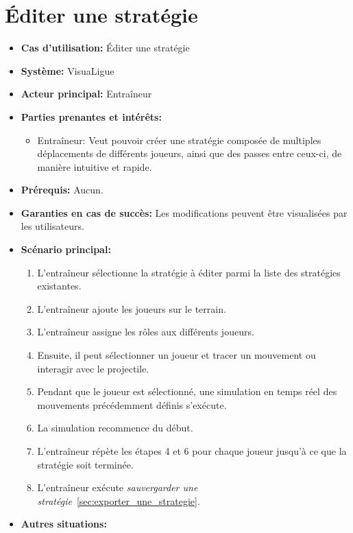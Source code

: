 \section{\'Editer une stratégie}
\label{sec:ajouter_une_strategie}
\begin{itemize}
    \item \textbf{Cas d'utilisation:} \'Editer une strat\'egie
    \item \textbf{Syst\`eme:} VisuaLigue
    \item \textbf{Acteur principal:} Entra\^ineur
    \item \textbf{Parties prenantes et int\'er\^ets:}
        \begin{itemize}
            \item Entraîneur: Veut pouvoir créer une stratégie composée de multiples déplacements de différents joueurs, ainsi que des passes entre ceux-ci, de manière intuitive et rapide.
        \end{itemize}
    \item \textbf{Prérequis:} Aucun.
    \item \textbf{Garanties en cas de succ\`es:} Les modifications peuvent être visualisées par les utilisateurs.
    \item \textbf{Sc\'enario principal:}
        \begin{enumerate}
            \item L'entraîneur sélectionne la stratégie à éditer parmi la liste des stratégies existantes.
            \item L'entraîneur ajoute les joueurs sur le terrain.
            \item L'entraîneur assigne les r\^oles aux diff\'erents joueurs.
            \item Ensuite, il peut s\'electionner un joueur et tracer un mouvement ou interagir avec le projectile.
            \item Pendant que le joueur est s\'electionn\'e, une simulation en temps r\'eel des mouvements pr\'ec\'edemment d\'efinis s'ex\'ecute.
            \item La simulation recommence du d\'ebut.
            \item L'entraîneur répète les étapes 4 et 6 pour chaque joueur jusqu'à ce que la stratégie soit terminée.
            \item L'entraîneur exécute \textit{sauvergarder une stratégie}~\ref{sec:exporter_une_strategie}.
        \end{enumerate}
    \item \textbf{Autres situations:}

\end{itemize}
